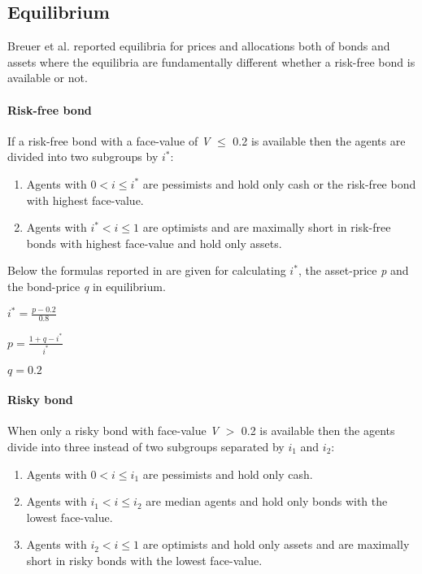 \documentclass[../Bachelorarbeit.tex]{subfiles}
\begin{document}
\subsection{Equilibrium}
Breuer et al. reported equilibria for prices and allocations both of bonds and assets where the equilibria are fundamentally different whether a risk-free bond is available or not.

\paragraph{Risk-free bond}
If a risk-free bond with a face-value of \textit{V} $\leq$ 0.2 is available then the agents are divided into two subgroups by $i^*$:

\begin{enumerate}
\item Agents with $0 < i \leq i^*$ are pessimists and hold only cash or the risk-free bond with highest face-value.
\item Agents with $i^* < i \leq 1$ are optimists and are maximally short in risk-free bonds with highest face-value and hold only assets.
\end{enumerate}

Below the formulas reported in \cite{Breuer2015} are given for calculating $i^*$, the asset-price \textit{p} and the bond-price \textit{q} in equilibrium.

\begin{center}
$i^* = \frac{p - 0.2}{0.8}$
\end{center}

\begin{center}
$p = \frac{1 + q - i^*}{i^*}$
\end{center}

\begin{center}
$q = 0.2$
\end{center}

\paragraph{Risky bond}
When only a risky bond with face-value \textit{V} $>$ 0.2 is available then the agents divide into three instead of two subgroups separated by $i_{1}$ and $i_{2}$:

\begin{enumerate}
\item Agents with $0 < i \leq i_{1}$ are pessimists and hold only cash.
\item Agents with $i_{1} < i \leq i_{2}$ are median agents and hold only bonds with the lowest face-value.
\item Agents with $i_{2} < i \leq 1$ are optimists and hold only assets and are maximally short in risky bonds with the lowest face-value.
\end{enumerate} 
\end{document}
